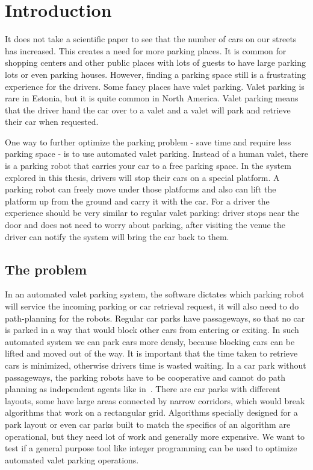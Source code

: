 \section{Introduction}
It does not take a scientific paper to see that the number of cars on our
streets has increased. This creates a need for more parking places. It is
common for shopping centers and other public places with lots of guests to have
large parking lots or even parking houses. However, finding a parking space
still is a frustrating experience for the drivers. Some fancy places have valet
parking. Valet parking is rare in Estonia, but it is quite common in North
America. Valet parking means that the driver hand the car over to a valet and a
valet will park and retrieve their car when requested.

One way to further optimize the parking problem - save time and require less 
parking space - is to use automated valet parking.
Instead of a human valet, there is a parking robot that
carries your car to a free parking space. In the system explored in this
thesis, drivers will stop their cars on a special platform. A parking robot can
freely move under those platforms and also can lift the platform up from the
ground and carry it with the car. For a driver the experience should be very 
similar to regular valet parking: driver stops near the door and does not need to worry about parking,
after visiting the venue the driver can notify the system will bring the
car back to them.
\subsection{The problem}
In an automated valet parking system, the software dictates which parking robot 
will service the incoming parking or car retrieval request, it will also need 
to do path-planning for the robots. 
Regular car parks have passageways, so that no car is parked in a way that would block
other cars from entering or exiting. In such automated system we can park cars
more densly, because blocking cars can be lifted and moved out of the way.
It is important that the time taken to retrieve cars is minimized, otherwise
drivers time is wasted waiting. In a car park without passageways, the parking 
robots have to be cooperative and cannot do path planning as independent agents 
like in~\cite{wurman2008coordinating}. There are car parks with different layouts, 
some have large areas connected by narrow corridors, which would break algorithms 
that work on a rectangular grid. Algorithms specially designed for a park layout 
or even car parks built to match the specifics of an algorithm are operational, 
but they need lot of work and generally more expensive. We want to test if a 
general purpose tool like integer programming can be used to optimize automated 
valet parking operations.

